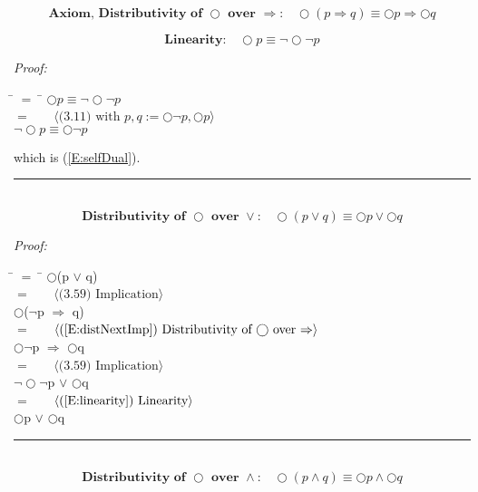 \documentclass[fleqn, leqno]{article}
\newcommand{\lgap}{2pt}                             %
\newcommand{\mymathindent}{24pt}                    %
\newcommand{\Next}{\bigcirc}
\newcommand{\myqed}{\hfill\rule[-.23ex]{1.2ex}{2.0ex}}
\newcommand{\Gll} {\langle}                         %
\newcommand{\Ggg} {\rangle}                         %
\newcommand{\Hint}[1]     {\ \ \ $\Gll              \mbox{#1} \Ggg$ }   %
\begin{document}
\begin{equation}\label{E:distNextImp}
\textbf{Axiom, Distributivity of $\Next$ over $\Rightarrow$:}\quad \Next (p \Rightarrow q) \equiv \Next p \Rightarrow \Next q
\end{equation}

\begin{equation}\label{E:linearity}
\textbf{Linearity:}\quad \Next p \equiv \lnot\Next\lnot p
\end{equation}

\emph{Proof:}
\begin{tabbing}
\hspace{\mymathindent} \= $= \;$ \= \kill
  \> \>   $\Next p \equiv \lnot\Next\lnot p$\\[\lgap]
  \> $=$  \>  \Hint{(3.11) with $p,q := \Next\lnot p, \Next p$} \\[\lgap]
  \> \>   $\lnot\Next p \equiv \Next\lnot p$
\end{tabbing}
which is (\ref{E:selfDual}). \myqed\\[\lgap]


\begin{equation}\label{E:distNextOr}
\textbf{Distributivity of $\Next$ over $\lor$:}\quad \Next (p \lor q) \equiv \Next p \lor \Next q
\end{equation}


\emph{Proof:}
\begin{tabbing}
\hspace{\mymathindent} \= $= \;$ \= \kill
	\> \>   $\Next$(p $\lor$ q)\\[\lgap]
	\> $=$  \>  \Hint{(3.59) Implication}\\[\lgap]
	\> \>   $\Next$($\lnot$p $\Rightarrow$ q)\\[\lgap]
	\> $=$  \>  \Hint{(\ref{E:distNextImp}) Distributivity of $\Next$ over $\Rightarrow$}\\[\lgap]
	\> \>   $\Next\lnot$p $\Rightarrow$ $\Next$q\\[\lgap]
	\> $=$  \>  \Hint{(3.59) Implication}\\[\lgap]
	\> \>   $\lnot\Next\lnot$p $\lor$ $\Next$q\\[\lgap]
	\> $=$  \>  \Hint{(\ref{E:linearity}) Linearity}\\[\lgap]
	\> \>   $\Next$p $\lor$ $\Next$q
\end{tabbing}
\myqed\\[\lgap]

\begin{equation}\label{E:distNextAnd}
\textbf{Distributivity of $\Next$ over $\land$:}\quad \Next (p \land q) \equiv \Next p \land \Next q
\end{equation}
\end{document}
